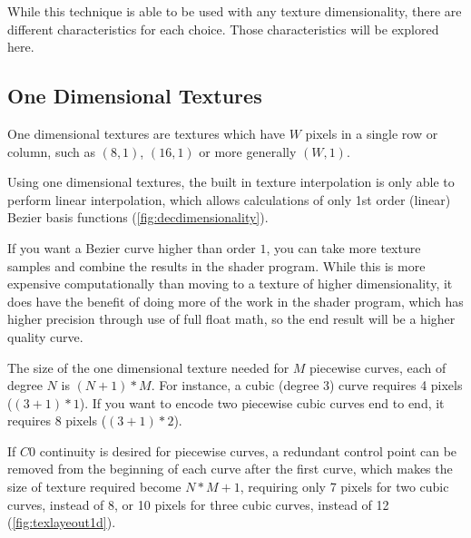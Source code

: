 \documentclass{jcgt}
\begin{document}
While this technique is able to be used with any texture dimensionality, there are different characteristics for each choice.  Those characteristics will be explored here.

\subsection{One Dimensional Textures}

One dimensional textures are textures which have $W$ pixels in a single row or column, such as $(8,1)$, $(16,1)$ or more generally $(W,1)$.

Using one dimensional textures, the built in texture interpolation is only able to perform linear interpolation, which allows calculations of only 1st order (linear) Bezier basis functions (\autoref{fig:decdimensionality}).

If you want a Bezier curve higher than order $1$, you can take more texture samples and combine the results in the shader program.  While this is more expensive computationally than moving to a texture of higher dimensionality, it does have the benefit of doing more of the work in the shader program, which has higher precision through use of full float math, so the end result will be a higher quality curve.

The size of the one dimensional texture needed for $M$ piecewise curves, each of degree $N$ is $(N+1)*M$. For instance, a cubic (degree 3) curve requires 4 pixels ($(3+1)*1$).  If you want to encode two piecewise cubic curves end to end, it requires 8 pixels ($(3+1)*2$).

If $C0$ continuity is desired for piecewise curves, a redundant control point can be removed from the beginning of each curve after the first curve, which makes the size of texture required become $N*M+1$, requiring only 7 pixels for two cubic curves, instead of 8, or 10 pixels for three cubic curves, instead of 12 (\autoref{fig:texlayeout1d}).
\end{document}
